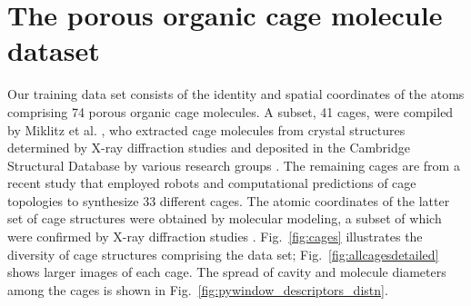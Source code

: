 \documentclass[journal=jacsat,manuscript=article,layout=traditional]{achemso}
\begin{document}

\section{The porous organic cage molecule dataset} Our training data set consists of the identity and spatial coordinates of the atoms comprising 74 porous organic cage molecules. A subset, 41 cages, were compiled by Miklitz et al. \cite{miklitz2017computational}, {\color{red} who extracted cage molecules from crystal structures determined by X-ray diffraction studies and deposited in the Cambridge Structural Database \cite{allen2002cambridge} by various research groups \cite{hasell2016porous,evans2015synthesis,zhang2014organic}}. The remaining cages are from a recent study that employed robots and {\color{red} computational predictions of cage topologies} \cite{greenaway2018high} to synthesize 33 different cages. {\color{red} The atomic coordinates of the latter set of cage structures were obtained by molecular modeling, a subset of which were confirmed by X-ray diffraction studies \cite{greenaway2018high}.} Fig.~\ref{fig:cages} illustrates the diversity of cage structures comprising the data set; Fig.~\ref{fig:allcagesdetailed} shows larger images of each cage. The spread of cavity and molecule diameters among the cages is shown in Fig.~\ref{fig:pywindow_descriptors_distn}.
\end{document}
